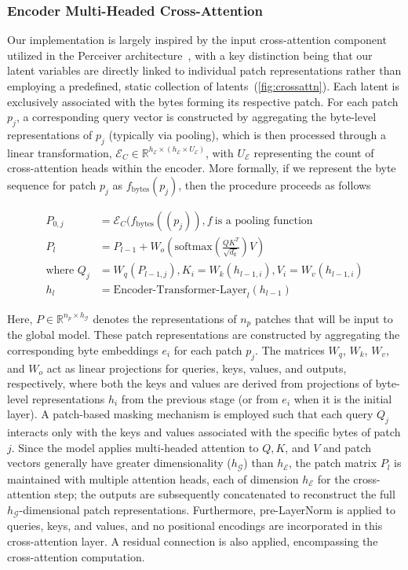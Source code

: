 \subsubsection{Encoder Multi-Headed Cross-Attention}
\label{sec:enc-cross-attn}
Our implementation is largely inspired by the input cross-attention component utilized in the Perceiver architecture~\citep{jaegle2021perceiver}, with a key distinction being that our latent variables are directly linked to individual patch representations rather than employing a predefined, static collection of latents~(\autoref{fig:crossattn}). Each latent is exclusively associated with the bytes forming its respective patch. For each patch $p_j$, a corresponding query vector is constructed by aggregating the byte-level representations of $p_j$ (typically via pooling), which is then processed through a linear transformation, $\mathcal{E}_{C} \in \mathbb{R}^{h_{\mathcal{E}} \times (h_{\mathcal{E}} \times U_{\mathcal{E}})}$, with $U_{\mathcal{E}}$ representing the count of cross-attention heads within the encoder. More formally, if we represent the byte sequence for patch $p_j$ as $f_{\text{bytes}}(p_j)$, then the procedure proceeds as follows

\begin{align}
P_{0,j} &= \mathcal{E}_{C}(f_\text{bytes}((p_j)), f~ \text{is a pooling function} \\
P_l &= P_{l-1} + W_o\left(\text{softmax}\left(\frac{QK^T}{\sqrt{d_k}}\right)V\right) \\
\text{where } Q_j &= W_q(P_{l-1,j}), K_i = W_k(h_{l-1,i}), V_i = W_v(h_{l-1,i}) \\
h_l &= \text{Encoder-Transformer-Layer}_l(h_{l-1})
\end{align}

Here, $P \in \mathbb{R}^{n_p \times h_{\mathcal{G}}}$ denotes the representations of $n_p$ patches that will be input to the global model. These patch representations are constructed by aggregating the corresponding byte embeddings $e_i$ for each patch $p_j$. The matrices $W_q$, $W_k$, $W_v$, and $W_o$ act as linear projections for queries, keys, values, and outputs, respectively, where both the keys and values are derived from projections of byte-level representations $h_i$ from the previous stage (or from $e_i$ when it is the initial layer). A patch-based masking mechanism is employed such that each query $Q_j$ interacts only with the keys and values associated with the specific bytes of patch $j$. Since the model applies multi-headed attention to $Q, K$, and $V$ and patch vectors generally have greater dimensionality ($h_{\mathcal{G}}$) than $h_{\mathcal{E}}$, the patch matrix $P_l$ is maintained with multiple attention heads, each of dimension $h_{\mathcal{E}}$ for the cross-attention step; the outputs are subsequently concatenated to reconstruct the full $h_{\mathcal{G}}$-dimensional patch representations. Furthermore, pre-LayerNorm is applied to queries, keys, and values, and no positional encodings are incorporated in this cross-attention layer. A residual connection is also applied, encompassing the cross-attention computation.

